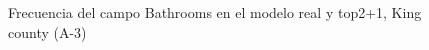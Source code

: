 \begin{figure}[H]
    \centering
    
    \caption{Frecuencia del campo Bathrooms en el modelo real y top2+1, King county (A-3)}
    \label{frecuency-top2+1-bathrooms}
\end{figure}